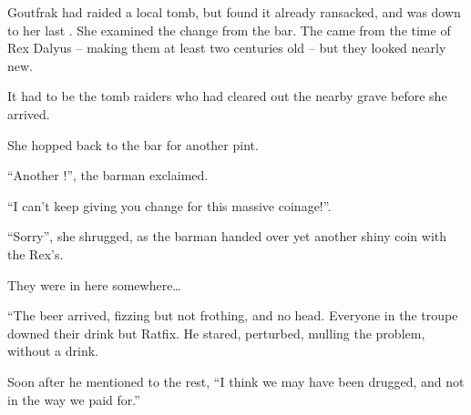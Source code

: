 \begin{multicols}{2}
\ifodd\value{r4}
\begin{exampletext}
  Goutfrak had raided a local tomb, but found it already ransacked, and was down to her last .
  She examined the change from the bar.
  The  came from the time of Rex Dalyus -- making them at least two centuries old -- but they looked nearly new.

  It had to be the tomb raiders who had cleared out the nearby grave before she arrived.

  She hopped back to the bar for another pint.

  ``Another !'',
  the barman exclaimed.

  ``I can't keep giving you change for this massive coinage!''.

  ``Sorry'',
  she shrugged, as the barman handed over yet another shiny coin with the Rex's.

  They were in here somewhere\ldots

\end{exampletext}

\else

\begin{exampletext}
  ``The beer arrived, fizzing but not frothing, and no head.
  Everyone in the troupe downed their drink but Ratfix.
  He stared, perturbed, mulling the problem, without a drink.

  Soon after he mentioned to the rest,
  ``I think we may have been drugged, and not in the way we paid for.''
\end{exampletext}
\fi

\end{multicols}

